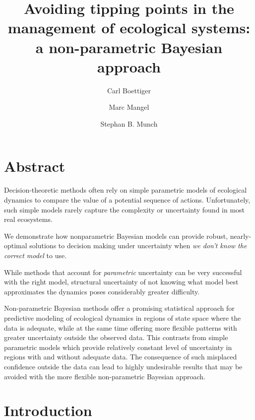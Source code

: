 \documentclass[author-year, review]{elsarticle} %
\begin{document}
\begin{frontmatter}
  \title{Avoiding tipping points in the management of ecological systems: a
         non-parametric Bayesian approach}
  \author[cstar]{Carl Boettiger}
  \author[cstar]{Marc Mangel}
  \author[noaa]{Stephan B. Munch}
  \address[cstar]{Center for Stock Assessment Research, Department of Applied Math and Statistics, University of California, Mail Stop SOE-2, Santa Cruz, CA 95064, USA}
  \address[noaa]{Southwest Fisheries Science Center, National Oceanic and Atmospheric Administration, 110 Shaffer Road, Santa Cruz, CA 95060, USA}
 \end{frontmatter}


\section{Abstract}

Decision-theoretic methods often rely on simple parametric models of
ecological dynamics to compare the value of a potential sequence of
actions. Unfortunately, such simple models rarely capture the complexity
or uncertainty found in most real ecosystems.

We demonstrate how nonparametric Bayesian models can provide robust,
nearly-optimal solutions to decision making under uncertainty when
\emph{we don't know the correct model} to use.

While methods that account for \emph{parametric} uncertainty can be very
successful with the right model, structural uncertainty of not knowing
what model best approximates the dynamics poses considerably greater
difficulty.

Non-parametric Bayesian methods offer a promising statistical approach
for predictive modeling of ecological dynamics in regions of state space
where the data is adequate, while at the same time offering more
flexible patterns with greater uncertainty outside the observed data.
This contrasts from simple parametric models which provide relatively
constant level of uncertainty in regions with and without adequate data.
The consequence of such misplaced confidence outside the data can lead
to highly undesirable results that may be avoided with the more flexible
non-parametric Bayesian approach.

\section{Introduction}
\end{document}
